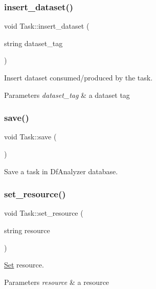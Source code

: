\subsubsection{\texorpdfstring{insert\+\_\+dataset()}{insert\_dataset()}}
{\footnotesize\ttfamily void Task\+::insert\+\_\+dataset (\begin{DoxyParamCaption}\item[{string}]{dataset\+\_\+tag }\end{DoxyParamCaption})\hspace{0.3cm}{\ttfamily [protected]}}

Insert dataset consumed/produced by the task. 
\begin{DoxyParams}{Parameters}
{\em dataset\+\_\+tag} & a dataset tag \\
\hline
\end{DoxyParams}
\mbox{\label{classTask_a139cdf67c69c188c1a3ccc259d01da33}} 
\subsubsection{\texorpdfstring{save()}{save()}}
{\footnotesize\ttfamily void Task\+::save (\begin{DoxyParamCaption}{ }\end{DoxyParamCaption})\hspace{0.3cm}{\ttfamily [protected]}}

Save a task in Df\+Analyzer database. \mbox{\label{classTask_a60c02d44aeaae258738b5e65e945736b}} 
\subsubsection{\texorpdfstring{set\+\_\+resource()}{set\_resource()}}
{\footnotesize\ttfamily void Task\+::set\+\_\+resource (\begin{DoxyParamCaption}\item[{string}]{resource }\end{DoxyParamCaption})}

\hyperlink{classSet}{Set} resource. 
\begin{DoxyParams}{Parameters}
{\em resource} & a resource \\
\hline
\end{DoxyParams}
\mbox{\label{classTask_ac89f5349a2b63b6362a30f2488b39ad9}} 

